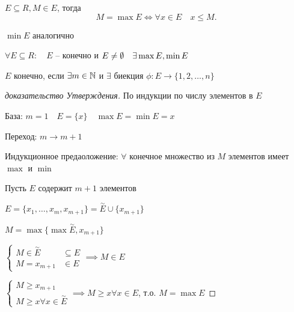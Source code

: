     \begin{definition}
        $E\subseteq R, M\in E$, тогда \[
        M = \max E \iff  \forall x\in E\quad x\leqslant M
        .\] 

        $\min E$ аналогично
    \end{definition}

    \begin{statement}
        $\forall E\subseteq R:\quad E$ -- конечно и $E\neq \emptyset \quad \exists \max E, \min E$
    \end{statement}
    \begin{definition}
        $E$ конечно, если $\exists  m\in \mathbb{N} $ и $\exists $ биекция $\phi:E \to \{1, 2, \ldots, n\}$
    \end{definition}
    \begin{proof}
        [доказательство Утверждения]
        По индукции по числу элементов в $E$

        База: $m=1\quad E = \{x\}\quad \max E = \min E  = x$

        Переход: $m\to m+1$

        Индукционное предаоложение: $\forall $ конечное множество из $M$ элементов имеет $\max$ и $\min$

        Пусть $E$ содержит $m+1$ элементов

        $E = \{x_1, \ldots, x_{m}, x_{m+1} \} = \overset{\sim }E \cup \{x_{m+1}\}$

        $M = \max \{\max \overset{\sim }E, x_{m+1}\}$

        $\begin{cases}
            M\in \overset{\sim }E&\subseteq E\\
            M = x_{m+1}&\in E
        \end{cases} \implies M\in E$

        $\begin{cases}
            M\geqslant x_{m+1}\\
            M\geqslant x \forall x\in \overset{\sim }E
        \end{cases} \implies  M\geqslant x \forall x\in E$, т.о. $M = \max E$
    \end{proof}

